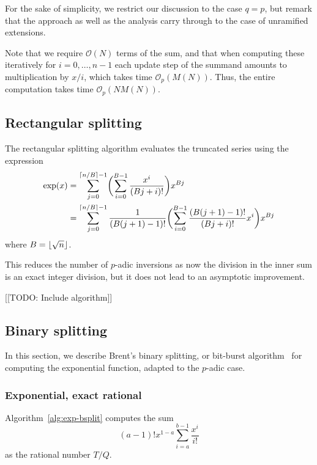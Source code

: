 For the sake of simplicity, we restrict our discussion to the case 
$q = p$, but remark that the approach as well as the analysis carry 
through to the case of unramified extensions.

Note that we require $\mathcal{O}(N)$ terms of the sum, 
and that when computing these iteratively for $i = 0, \dotsc, n-1$ 
each update step of the summand amounts to multiplication by $x / i$, 
which takes time $\mathcal{O}_p(M(N))$.  Thus, the entire computation 
takes time $\mathcal{O}_p(N M(N))$.

\subsection{Rectangular splitting}

The rectangular splitting algorithm evaluates the truncated series 
using the expression 
\begin{align}
\exp(x) & = \sum_{j=0}^{\left\lceil n/B\right\rceil - 1} 
            \biggl( \sum_{i=0}^{B-1} \frac{x^i}{(Bj + i)!} \biggr) x^{Bj} \\
        & = \sum_{j=0}^{\left\lceil n/B\right\rceil - 1} 
            \frac{1}{(B (j+1) - 1)!} \biggl( \sum_{i=0}^{B-1} \frac{(B (j+1) - 1)!}{(Bj + i)!} x^i \biggr) x^{Bj}
\end{align}
where $B = \lfloor\sqrt{n}\rfloor$.

This reduces the number of $p$-adic inversions as now the division in the 
inner sum is an exact integer division, but it does not lead to an asymptotic 
improvement.

[[TODO:  Include algorithm]]

\subsection{Binary splitting}

In this section, we describe Brent's binary splitting, or bit-burst 
algorithm~\citep{Brent1976} for computing the exponential function, 
adapted to the $p$-adic case.

\subsubsection{Exponential, exact rational}

Algorithm~\ref{alg:exp-bsplit} computes the sum 
\begin{equation}
(a-1)! x^{1-a} \sum_{i=a}^{b-1} \frac{x^i}{i!}
\end{equation}
as the rational number $T/Q$.

